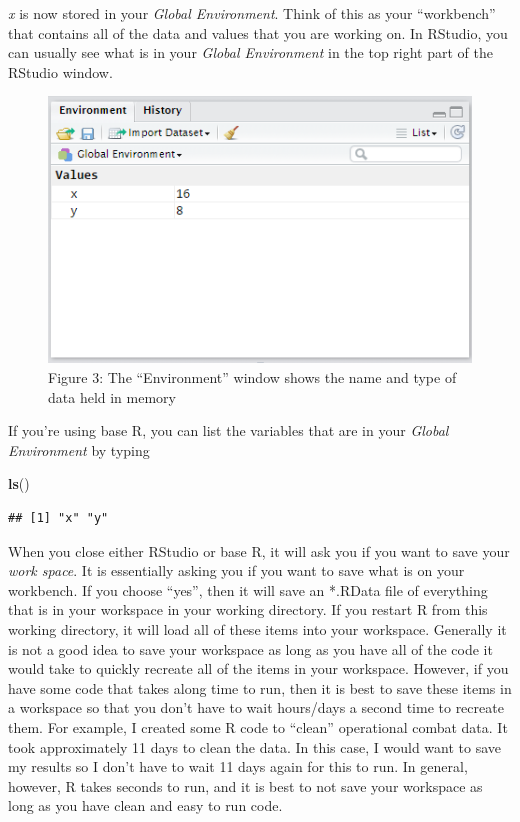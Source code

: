 \documentclass[]{book}
\newenvironment{Shaded}{\begin{snugshade}}{\end{snugshade}}
\newcommand{\KeywordTok}[1]{\textcolor[rgb]{0.13,0.29,0.53}{\textbf{{#1}}}}
\newcommand{\NormalTok}[1]{{#1}}
\begin{document}
\emph{x} is now stored in your \emph{Global Environment}. Think of this
as your ``workbench'' that contains all of the data and values that you
are working on. In RStudio, you can usually see what is in your
\emph{Global Environment} in the top right part of the RStudio window.

\begin{figure}[htbp]
\centering
\includegraphics{environment.PNG}
\caption{Figure 3: The ``Environment'' window shows the name and type of
data held in memory}
\end{figure}

If you're using base R, you can list the variables that are in your
\emph{Global Environment} by typing

\begin{Shaded}
\begin{Highlighting}[]
\KeywordTok{ls}\NormalTok{()}
\end{Highlighting}
\end{Shaded}

\begin{verbatim}
## [1] "x" "y"
\end{verbatim}

When you close either RStudio or base R, it will ask you if you want to
save your \emph{work space}. It is essentially asking you if you want to
save what is on your workbench. If you choose ``yes'', then it will save
an *.RData file of everything that is in your workspace in your working
directory. If you restart R from this working directory, it will load
all of these items into your workspace. Generally it is not a good idea
to save your workspace as long as you have all of the code it would take
to quickly recreate all of the items in your workspace. However, if you
have some code that takes along time to run, then it is best to save
these items in a workspace so that you don't have to wait hours/days a
second time to recreate them. For example, I created some R code to
``clean'' operational combat data. It took approximately 11 days to
clean the data. In this case, I would want to save my results so I don't
have to wait 11 days again for this to run. In general, however, R takes
seconds to run, and it is best to not save your workspace as long as you
have clean and easy to run code.
\end{document}
